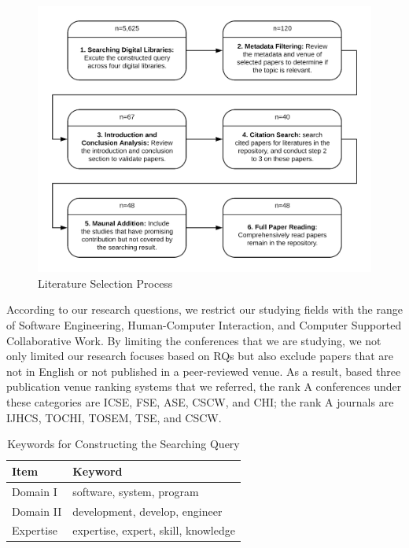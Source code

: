 \begin{figure}
\includegraphics[width = \columnwidth]{process}
  \caption{Literature Selection Process}
  \label{fig:process}
\end{figure}

According to our research questions, we restrict our studying fields with the range of Software Engineering, Human-Computer Interaction, and Computer Supported Collaborative Work. By limiting the conferences that we are studying, we not only limited our research focuses based on RQs but also exclude papers that are not in English or not published in a peer-reviewed venue. As a result, based three publication venue ranking systems that we referred, the rank A conferences under these categories are ICSE, FSE, ASE, CSCW, and CHI; the rank A journals are IJHCS, TOCHI, TOSEM, TSE, and CSCW.

\begin{table}[tbp]
\centering
\begin{tabular}{l l}
\hline
\textbf{Item}      & {\textbf{Keyword}}                              \\ \hline
Domain I  & software, system, program          \\ 
Domain II & development, develop, engineer       \\ 
Expertise & expertise, expert, skill, knowledge \\ \hline
\end{tabular}
\caption{Keywords for Constructing the Searching Query}
\label{table:keyword}
\end{table}

